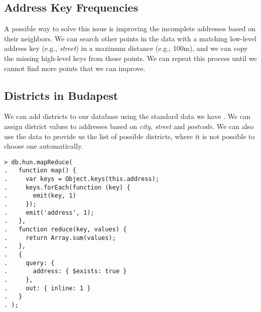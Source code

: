 \documentclass{article}
\begin{document}
\begin{multicols}{2}
\subsection{Address Key Frequencies}

A possible way to solve this issue is improving the incomplete addresses based on their neighbors. We can search other points in the data with a matching low-level address key (e.g., \textit{street}) in a maximum distance (e.g., 100m), and we can copy the missing high-level keys from those points. We can repeat this process until we cannot find more points that we can improve.


\subsection{Districts in Budapest}

We can add districts to our database using the standard data we have \cite{HungarianPostcodes:2015}. We can assign district values to addresses based on \textit{city}, \textit{street} and \textit{postcode}. We can also use the data to provide us the list of possible districts, where it is not possible to choose one automatically.


\begin{lstlisting}[caption=Get the frequency of the address keys.,label={listing:9}]
> db.hun.mapReduce(
.   function map() {
.     var keys = Object.keys(this.address);
.     keys.forEach(function (key) {
.       emit(key, 1)
.     });
.     emit('address', 1);
.   },
.   function reduce(key, values) {
.     return Array.sum(values);
.   },
.   {
.     query: {
.       address: { $exists: true }
.     },
.     out: { inline: 1 }
.   }
. );
\end{lstlisting}


\end{multicols}
\end{document}

